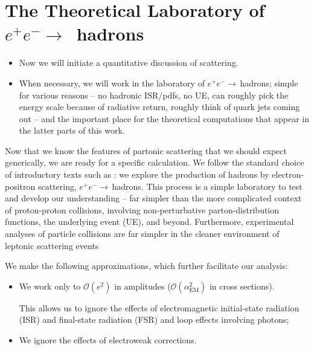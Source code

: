 \section{The Theoretical Laboratory of \texorpdfstring{\(e^+ e^- \to \,\) hadrons}{e+e- -> hadrons}}
\label{sec:partonic-scattering}

\begin{itemize}
    \item
Now we will initiate a quantitative discussion of scattering.

    \item
When necessary, we will work in the laboratory of \(e^+ e^-\to\,\)hadrons;
%
simple for various reasons -- no hadronic ISR/pdfs, no UE, can roughly pick the energy scale because of radiative return, roughly think of quark jets coming out -- and the important place for the theoretical computations that appear in the latter parts of this work.
\end{itemize}











Now that we know the features of partonic scattering that we should expect generically, we are ready for a specific calculation.
%
We follow the standard choice of introductory texts such as \cite{}:
%
we explore the production of hadrons by electron-positron scattering, \(e^+ e^-\to\,\)hadrons.
%
This process is a simple laboratory to test and develop our understanding -- far simpler than the more complicated context of proton-proton collisions, involving non-perturbative parton-distribution functions, the underlying event (UE), and beyond.
%
Furthermore, experimental analyses of particle collisions are far simpler in the cleaner environment of leptonic scattering events

We make the following approximations, which further facilitate our analysis:
\begin{itemize}
    \item
    We work only to \(\mathcal{O}(e^2)\) in amplitudes (\(\mathcal{O}(\alpha_\text{EM}^2)\) in cross sections).

    This allows us to ignore the effects of electromagnetic initial-state radiation (ISR) and final-state radiation (FSR) and loop effects involving photons;

    \item
    We ignore the effects of electroweak corrections.
\end{itemize}

